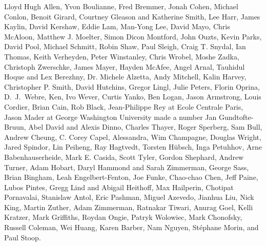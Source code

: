 \documentclass[10pt]{book}
\begin{document}
Lloyd Hugh Allen,
Yvon Boulianne,
Fred Bremmer,
Jonah Cohen,
Michael Conlon,
Benoit Girard,
Courtney Gleason and Katherine Smith,
Lee Harr,
James Kaylin,
David Kershaw,
Eddie Lam,
Man-Yong Lee,
David Mayo,
Chris McAloon,
Matthew J. Moelter,
Simon Dicon Montford,
John Ouzts,
Kevin Parks,
David Pool,
Michael Schmitt,
Robin Shaw,
Paul Sleigh,
Craig T. Snydal,
Ian Thomas,
Keith Verheyden,
Peter Winstanley,
Chris Wrobel,
Moshe Zadka,
Christoph Zwerschke,
James Mayer,
Hayden McAfee,
Angel Arnal,
Tauhidul Hoque and Lex Berezhny,
Dr. Michele Alzetta,
Andy Mitchell,
Kalin Harvey,
Christopher P. Smith,
David Hutchins,
Gregor Lingl,
Julie Peters,
Florin Oprina,
D.~J.~Webre,
Ken,
Ivo Wever,
Curtis Yanko,
Ben Logan,
Jason Armstrong,
Louis Cordier,
Brian Cain,
Rob Black,
Jean-Philippe Rey at Ecole Centrale Paris,
Jason Mader at George Washington University made a number
Jan Gundtofte-Bruun,
Abel David and Alexis Dinno,
Charles Thayer,
Roger Sperberg,
Sam Bull,
Andrew Cheung,
C. Corey Capel,
Alessandra,
Wim Champagne,
Douglas Wright,
Jared Spindor,
Lin Peiheng,
Ray Hagtvedt,
Torsten H\"{u}bsch,
Inga Petuhhov,
Arne Babenhauserheide,
Mark E. Casida,
Scott Tyler,
Gordon Shephard,
Andrew Turner,
Adam Hobart,
Daryl Hammond and Sarah Zimmerman,
George Sass,
Brian Bingham,
Leah Engelbert-Fenton,
Joe Funke,
Chao-chao Chen,
Jeff Paine,
Lubos Pintes,
Gregg Lind and Abigail Heithoff,
Max Hailperin,
Chotipat Pornavalai,
Stanislaw Antol,
Eric Pashman,
Miguel Azevedo,
Jianhua Liu,
Nick King,
Martin Zuther,
Adam Zimmerman,
Ratnakar Tiwari,
Anurag Goel,
Kelli Kratzer,
Mark Griffiths,
Roydan Ongie,
Patryk Wolowiec,
Mark Chonofsky,
Russell Coleman,
Wei Huang,
Karen Barber,
Nam Nguyen,
St\'{e}phane Morin,
and
Paul Stoop.

\normalsize

\printindex

\clearemptydoublepage
\end{document}
